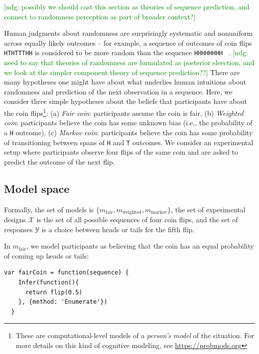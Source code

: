 \documentclass{article}
\newcommand{\ndg}[1]{\textcolor{Green}{[ndg: #1]}}
\begin{document}
\ndg{possibly we should cast this section as theories of sequence prediction, and connect to randomness perception as part of broader context?}

Human judgments about randomness are surprisingly systematic and nonuniform across equally likely outcomes -- for example, a sequence of outcomes of coin flips \lstinline{HTHTTTHH} is considered to be more random than the sequence \lstinline{HHHHHHHH} ~\cite{goodfellow38:jep, griffiths01:cogsci}.
\ndg{need to say that theories of randomness are formulated as posterior sleection, and we look at the simpler component theory of sequence prediction??}
There are many hypotheses one might have about what underlies human intuitions about randomness and prediction of the next observation in a sequence.
Here, we consider three simple hypotheses about the beliefs that participants have about the coin flips\footnote{These are computational-level models of a \emph{person's model} of the situation. For more details on this kind of cognitive modeling, see \url{https://probmods.org}}: (a) \emph{Fair coin}: participants assume the coin is fair, (b) \emph{Weighted coin}: participants believe the coin has some unknown bias (i.e., the probability of a \lstinline{H} outcome), (c) \emph{Markov coin}: participants believe the coin has some probability of transitioning between spans of \lstinline{H} and \lstinline{T} outcomes.
We consider an experimental setup where participants observe four flips of the same coin and are asked to predict the outcome of the next flip.


\subsection{Model space}

Formally, the set of models is $\{m_{\text{fair}}, m_{\text{weighted}}, m_{\text{markov}}\}$, the set of experimental designs $\mathcal{X}$ is the set of all possible sequences of four coin flips, and the set of responses $\mathcal{Y}$ is a choice between heads or tails for the fifth flip.

In $m_{\text{fair}}$, we model participants as believing that the coin has an equal probability of coming up heads or tails:

\begin{lstlisting}[caption=Fair coin model,  label={lst:m_fair}]
  var fairCoin = function(sequence) {
    Infer(function(){
      return flip(0.5)
    }, {method: 'Enumerate'})
  }
\end{lstlisting}
\end{document}

